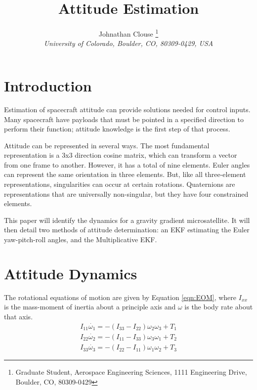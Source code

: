 \documentclass[]{aiaa-tc}%
\title{Attitude Estimation}
\author{
	Johnathan Clouse%
	\thanks{Graduate Student, Aerospace Engineering Sciences, 1111 Engineering Drive, Boulder, CO, 80309-0429}\\
	{\normalsize\itshape
		University of Colorado, Boulder, CO, 80309-0429, USA}
}
\begin{document}
	

	
	\maketitle
	
	\begin{abstract}
		\noindent 
		
	\end{abstract}
	
	\newpage
	
	\tableofcontents
	
	\newpage

	\section{Introduction}
Estimation of spacecraft attitude can provide solutions needed for control inputs. Many spacecraft have payloads that must be pointed in a specified direction to perform their function; attitude knowledge is the first step of that process. 

	\vspace{5 mm}

Attitude can be represented in several ways. The most fundamental representation is a 3x3 direction cosine matrix, which can transform a vector from one frame to another. However, it has a total of nine elements. Euler angles can represent the same orientation in three elements. But, like all three-element representations, singularities can occur at certain rotations. Quaternions are representations that are universally non-singular, but they have four constrained elements.

	\vspace{5 mm}

This paper will identify the dynamics for a gravity gradient microsatellite. It will then detail two methods of attitude determination: an EKF estimating the Euler yaw-pitch-roll angles, and the Multiplicative EKF.
	
	\section{Attitude Dynamics}
The rotational equations of motion are given by Equation \ref{eqn:EOM}, where $I_{xx}$ is the mass-moment of inertia about a principle axis and $\omega$ is the body rate about that axis.  
	\begin{equation}
		\begin{matrix}
		I_{11}\dot{\omega_1}=-(I_{33}-I_{22})\omega_2\omega_3+T_1\\ 
		I_{22}\dot{\omega_2}=-(I_{11}-I_{33})\omega_3\omega_1+T_2\\ 
		I_{33}\dot{\omega_3}=-(I_{22}-I_{11})\omega_1\omega_2+T_3
		\end{matrix}
		\label{eqn:EOM}
	\end{equation}
\end{document}
